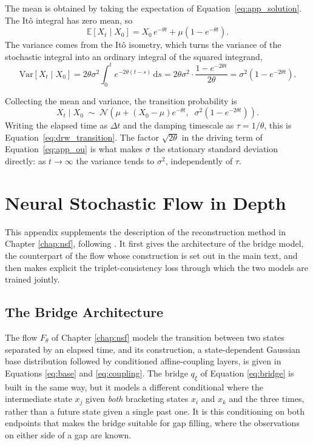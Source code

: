 The mean is obtained by taking the expectation of Equation~\ref{eq:app_solution}. The It\^o integral has zero mean, so
\begin{equation}
    \label{eq:app_mean}
    \mathbb{E}\!\left[X_t \mid X_0\right]
    = X_0\, e^{-\theta t} + \mu\left(1 - e^{-\theta t}\right).
\end{equation}
The variance comes from the It\^o isometry, which turns the variance of the stochastic integral into an ordinary integral of the squared integrand,
\begin{equation}
    \label{eq:app_var}
    \mathrm{Var}\!\left[X_t \mid X_0\right]
    = 2\theta\sigma^2 \int_0^t e^{-2\theta(t-s)}\,\mathrm{d}s
    = 2\theta\sigma^2 \cdot \frac{1 - e^{-2\theta t}}{2\theta}
    = \sigma^2\left(1 - e^{-2\theta t}\right).
\end{equation}

Collecting the mean and variance, the transition probability is
\begin{equation}
    \label{eq:app_transition}
    X_t \mid X_0 \;\sim\; \mathcal{N}\!\left(\mu + \left(X_0 - \mu\right)e^{-\theta t},\;\; \sigma^2\left(1 - e^{-2\theta t}\right)\right).
\end{equation}
Writing the elapsed time as $\Delta t$ and the damping timescale as $\tau = 1/\theta$, this is Equation~\ref{eq:drw_transition}. The factor $\sqrt{2\theta}$ in the driving term of Equation~\ref{eq:app_ou} is what makes $\sigma$ the stationary standard deviation directly: as $t \to \infty$ the variance tends to $\sigma^2$, independently of $\tau$.


\chapter{Neural Stochastic Flow in Depth}
\label{app:loss}

This appendix supplements the description of the reconstruction method in Chapter \ref{chap:nsf}, following \cite{Kiyohara2025SNF}. It first gives the architecture of the bridge model, the counterpart of the flow whose construction is set out in the main text, and then makes explicit the triplet-consistency loss through which the two models are trained jointly.

\section{The Bridge Architecture}
\label{app:bridge_arch}

The flow $F_\theta$ of Chapter \ref{chap:nsf} models the transition between two states separated by an elapsed time, and its construction, a state-dependent Gaussian base distribution followed by conditioned affine-coupling layers, is given in Equations \ref{eq:base} and \ref{eq:coupling}. The bridge $q_\xi$ of Equation \ref{eq:bridge} is built in the same way, but it models a different conditional where the intermediate state $x_j$ given \textit{both} bracketing states $x_i$ and $x_k$ and the three times, rather than a future state given a single past one. It is this conditioning on both endpoints that makes the bridge suitable for gap filling, where the observations on either side of a gap are known.

